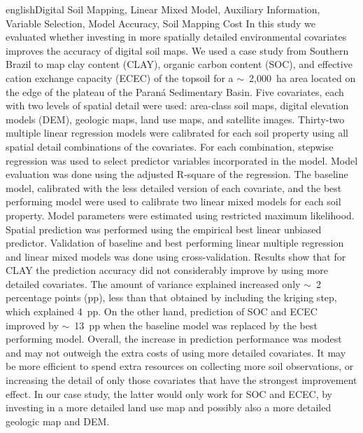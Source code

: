 \def\englishkeys{Digital Soil Mapping, Linear Mixed Model, Auxiliary 
  Information, Variable Selection, Model Accuracy, Soil Mapping Cost}
\begin{chapterabstract}{english}{\englishkeys}
In this study we evaluated whether investing in more spatially detailed 
environmental covariates improves the accuracy of digital soil maps. We used a 
case study from Southern Brazil to map clay content (CLAY), organic carbon 
content (SOC), and effective cation exchange capacity (ECEC) of the topsoil for
a $\sim$~2,000~ha area located on the edge of the plateau of the Paraná 
Sedimentary Basin. Five covariates, each with two levels of spatial detail were
used: area-class soil maps, digital elevation models (DEM), geologic maps, land
use maps, and satellite images. Thirty-two multiple linear regression models 
were calibrated for each soil property using all spatial detail combinations of
the covariates. For each combination, stepwise regression was used to select 
predictor variables incorporated in the model. Model evaluation was done using 
the adjusted R-square of the regression. The baseline model, calibrated with the
less detailed version of each covariate, and the best performing model were used
to calibrate two linear mixed models for each soil property. Model parameters 
were estimated using restricted maximum likelihood. Spatial prediction was 
performed using the empirical best linear unbiased predictor. Validation of 
baseline and best performing linear multiple regression and linear mixed models
was done using cross-validation. Results show that for CLAY the prediction 
accuracy did not considerably improve by using more detailed covariates. The 
amount of variance explained increased only $\sim$~2 percentage points (pp), 
less than that obtained by including the kriging step, which explained 4~pp. On
the other hand, prediction of SOC and ECEC improved by $\sim$~13~pp when the 
baseline model was replaced by the best performing model. Overall, the increase
in prediction performance was modest and may not outweigh the extra costs of 
using more detailed covariates. It may be more efficient to spend extra 
resources on collecting more soil observations, or increasing the detail of only
those covariates that have the strongest improvement effect. In our case study,
the latter would only work for SOC and ECEC, by investing in a more detailed 
land use map and possibly also a more detailed geologic map and DEM.
\end{chapterabstract}

